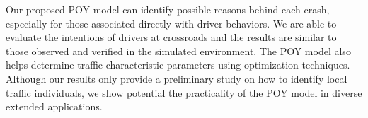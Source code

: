 Our proposed POY model can identify possible reasons behind each crash, especially for those associated directly with driver behaviors. We are able to  evaluate the intentions of drivers at crossroads and the results are similar to those observed and verified in the simulated environment. The POY model also helps determine traffic characteristic parameters using optimization techniques. Although our results only provide a preliminary study on how to identify local traffic individuals, we show potential the practicality of the POY model in diverse extended applications. 